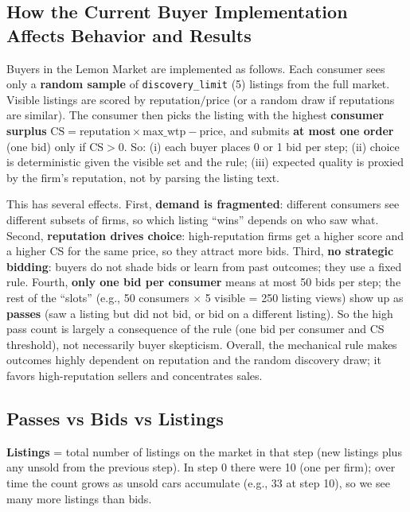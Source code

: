 \documentclass{article}
\begin{document}
\subsection{How the Current Buyer Implementation Affects Behavior and Results}

Buyers in the Lemon Market are implemented as follows. Each consumer sees only a \textbf{random sample} of \texttt{discovery\_limit} (5) listings from the full market. Visible listings are scored by \(\text{reputation} / \text{price}\) (or a random draw if reputations are similar). The consumer then picks the listing with the highest \textbf{consumer surplus} \(\text{CS} = \text{reputation} \times \text{max\_wtp} - \text{price}\), and submits \textbf{at most one order} (one bid) only if \(\text{CS} > 0\). So: (i) each buyer places 0 or 1 bid per step; (ii) choice is deterministic given the visible set and the rule; (iii) expected quality is proxied by the firm’s reputation, not by parsing the listing text.

This has several effects. First, \textbf{demand is fragmented}: different consumers see different subsets of firms, so which listing ``wins'' depends on who saw what. Second, \textbf{reputation drives choice}: high-reputation firms get a higher score and a higher CS for the same price, so they attract more bids. Third, \textbf{no strategic bidding}: buyers do not shade bids or learn from past outcomes; they use a fixed rule. Fourth, \textbf{only one bid per consumer} means at most 50 bids per step; the rest of the ``slots'' (e.g., 50 consumers \(\times\) 5 visible = 250 listing views) show up as \textbf{passes} (saw a listing but did not bid, or bid on a different listing). So the high pass count is largely a consequence of the rule (one bid per consumer and CS threshold), not necessarily buyer skepticism. Overall, the mechanical rule makes outcomes highly dependent on reputation and the random discovery draw; it favors high-reputation sellers and concentrates sales.

\subsection{Passes vs Bids vs Listings}

\textbf{Listings} = total number of listings on the market in that step (new listings plus any unsold from the previous step). In step 0 there were 10 (one per firm); over time the count grows as unsold cars accumulate (e.g., 33 at step 10), so we see many more listings than bids.
\end{document}
